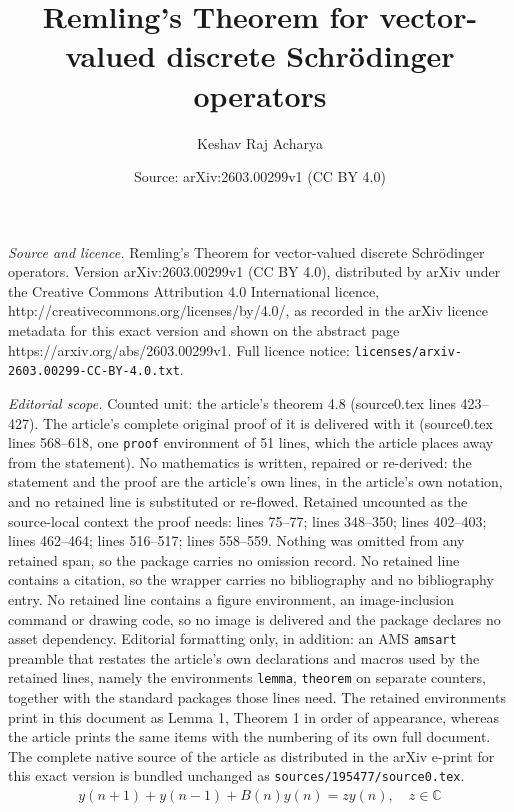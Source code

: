 \documentclass[10pt,a4paper]{amsart}
\title{Remling's Theorem for vector-valued discrete Schr\"odinger operators}
\author{Keshav Raj Acharya}
\date{Source: arXiv:2603.00299v1 (CC BY 4.0)}
\newcommand{\C}{\mathbb{C}}
\begin{document}
\maketitle

\noindent\emph{Source and licence.} Remling's Theorem for vector-valued discrete Schr\"odinger operators. Version arXiv:2603.00299v1 (CC BY 4.0), distributed by arXiv under the Creative Commons Attribution 4.0 International licence, http://creativecommons.org/licenses/by/4.0/, as recorded in the arXiv licence metadata for this exact version and shown on the abstract page https://arxiv.org/abs/2603.00299v1. Full licence notice: \texttt{licenses/arxiv-2603.00299-CC-BY-4.0.txt}.\par\smallskip

\noindent\textit{Editorial scope.} Counted unit: the article's theorem 4.8 (source0.tex lines 423--427). The article's complete original proof of it is delivered with it (source0.tex lines 568--618, one \texttt{proof} environment of 51 lines, which the article places away from the statement). No mathematics is written, repaired or re-derived: the statement and the proof are the article's own lines, in the article's own notation, and no retained line is substituted or re-flowed.  Retained uncounted as the source-local context the proof needs: lines 75--77; lines 348--350; lines 402--403; lines 462--464; lines 516--517; lines 558--559.  Nothing was omitted from any retained span, so the package carries no omission record.  No retained line contains a citation, so the wrapper carries no bibliography and no bibliography entry.  No retained line contains a figure environment, an image-inclusion command or drawing code, so no image is delivered and the package declares no asset dependency.  Editorial formatting only, in addition: an AMS \texttt{amsart} preamble that restates the article's own declarations and macros used by the retained lines, namely the environments \texttt{lemma}, \texttt{theorem} on separate counters, together with the standard packages those lines need.  The retained environments print in this document as Lemma 1, Theorem 1 in order of appearance, whereas the article prints the same items with the numbering of its own full document.  The complete native source of the article as distributed in the arXiv e-print for this exact version is bundled unchanged as \texttt{sources/195477/source0.tex}.
\begin{align}\label{ds}
y(n+1)+y(n-1)+B(n)y(n)=zy(n),\quad z\in \C 
\end{align}
\end{document}

